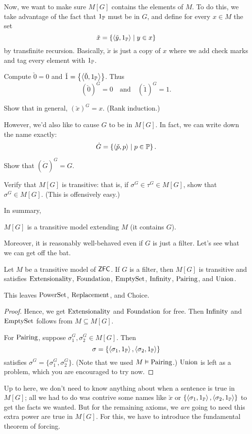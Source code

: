 Now, we want to make sure $M[G]$ contains the elements of $M$.
To do this, we take advantage of the fact that $1_\mathbb P$ must be in $G$, and define
for every $x \in M$ the set
\[ \check x = \left\{ \left<\check y, 1_\mathbb P\right> \mid y \in x \right\} \]
by transfinite recursion.
Basically, $\check x$ is just a copy of $x$ where we add check marks and tag every element with $1_\mathbb P$.

\begin{example}
	Compute $\check 0 = 0$ and $\check 1 = \left\{ \left<\check 0, 1_\mathbb P\right> \right\}$.
	Thus \[ (\check 0)^G = 0 \quad\text{and}\quad (\check 1)^G = 1. \]
\end{example}
\begin{ques}
	Show that in general, $(\check x)^G = x$.
	(Rank induction.)
\end{ques}

However, we'd also like to cause $G$ to be in $M[G]$.
In fact, we can write down the name exactly:
\[ \dot G = \left\{ \left<\check p, p\right> \mid p \in \mathbb P \right\}. \]
\begin{ques}
	Show that $(\dot G)^G = G$.
\end{ques}
\begin{ques}
	Verify that $M[G]$ is transitive:
	that is, if $\sigma^G \in \tau^G \in M[G]$, show that $\sigma^G \in M[G]$.
	(This is offensively easy.)
\end{ques}

In summary,
\begin{moral}
	$M[G]$ is a transitive model extending $M$ (it contains $G$).
\end{moral}

Moreover, it is reasonably well-behaved even if $G$ is just a filter.
Let's see what we can get off the bat.
\begin{lemma}
	Let $M$ be a transitive model of $\mathsf{ZFC}$.
	If $G$ is a filter, then $M[G]$ is transitive
	and satisfies $\mathrm{Extensionality}$, $\mathrm{Foundation}$, 
	$\mathrm{EmptySet}$, $\mathrm{Infinity}$, $\mathrm{Pairing}$, and $\mathrm{Union}$.
\end{lemma}

This leaves $\mathrm{PowerSet}$, $\mathrm{Replacement}$, and Choice.
\begin{proof}
	Hence, we get $\mathrm{Extensionality}$ and $\mathrm{Foundation}$ for free.
	Then $\mathrm{Infinity}$ and $\mathrm{EmptySet}$ follows from $M \subseteq M[G]$.

	For $\mathrm{Pairing}$, suppose $\sigma_1^G, \sigma_2^G \in M[G]$.
	Then
	\[ \sigma = 
		\left\{ \left<\sigma_1, 1_\mathbb P\right>, \left<\sigma_2, 1_\mathbb P\right> \right\}
	\]
	satisfies $\sigma^G = \{\sigma_1^G, \sigma_2^G\}$.
	(Note that we used $M \vDash \mathrm{Pairing}$.)
	$\mathrm{Union}$ is left as a problem, which you are encouraged to try now.
\end{proof}
Up to here, we don't need to know anything about when a sentence is true in $M[G]$;
all we had to do was contrive some names like $\check x$ or
$\left\{ \left<\sigma_1, 1_\mathbb P\right>, \left<\sigma_2, 1_\mathbb P\right> \right\}$
to get the facts we wanted.
But for the remaining axioms, we \emph{are} going to need this extra power
are true in $M[G]$.
For this, we have to introduce the fundamental theorem of forcing.

